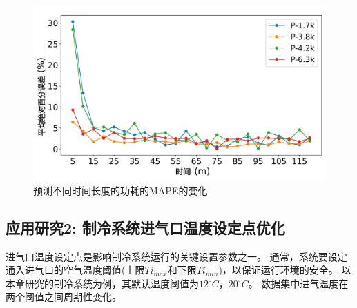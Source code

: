 

\begin{figure}
    \centering
    \includegraphics[width=0.8\linewidth]{figures/chapter4/power_error.pdf}
    \caption{预测不同时间长度的功耗的MAPE的变化}
    \label{fig:mape_evolution}
\end{figure}




\subsection{应用研究2: 制冷系统进气口温度设定点优化}
\label{sub:case-study2}
进气口温度设定点是影响制冷系统运行的关键设置参数之一。
通常，系统要设定通入进气口的空气温度阈值(上限$Ti_{max}$和下限$Ti_{min}$)，以保证运行环境的安全。
以本章研究的制冷系统为例，其默认温度阈值为$12^\circ C$，$20^\circ C$。
数据集中进气温度在两个阈值之间周期性变化。

